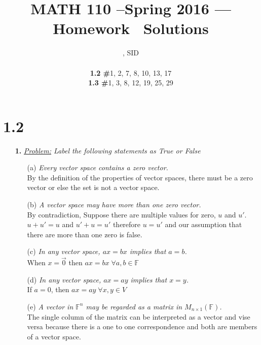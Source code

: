 \documentclass[11pt, fleqn]{article}
\title{MATH 110 --Spring 2016 --- Homework \Homework\ Solutions}
\author{\large{\Name, SID \SID}\\\small{\parbox{0cm}{\begin{tabbing}\textbf{1.2 \#}1, 2, 7, 8, 10, 13, 17\\\textbf{1.3 \#}1, 3, 8, 12, 19, 25, 29\end{tabbing}}}}
\date{}
\begin{document}
\maketitle
\section*{1.2}
\begin{itemize}
    \setlength\itemsep{5ex}
    \item [\textbf{1.}]
    \textit{\underline{Problem:} Label the following statements as True or False}
    \begin{itemize}
        \item[(a)] \textit{Every vector space contains a zero vector.}\\[1ex]
            \textbf{} By the definition of the properties of vector spaces, there must be a zero vector or else the set is not a vector space.\vspace{2ex}
            
        \item[(b)] \textit{A vector space may have more than one zero vector.}\\[1ex]
            \textbf{} By contradiction, Suppose there are multiple values for zero, $u$ and $u'$. $u + u' = u$ and $u' + u = u'$ therefore $u=u'$ and our assumption that there are more than one zero is false.\vspace{2ex}
            
        \item[(c)] \textit{In any vector space, $ax = bx$ implies that $a = b$.}\\[1ex]
            \textbf{} When $x=\vec{0}$ then $ax=bx\;\forall a,b \in \mathbb{F}$\vspace{2ex}
            
        \item[(d)] \textit{In any vector space, $ax = ay$ implies that $x = y$.}\\[1ex]
            \textbf{} If $a = 0$, then $ax=ay\;\forall x,y \in V$\vspace{2ex}
            
        \item[(e)] \textit{A vector in $\mathbb{F}^n$ may be regarded as a matrix in $M_{n\times1}(\mathbb{F})$.}\\[1ex]
            \textbf{} The single column of the matrix can be interpreted as a vector and vise versa because there is a one to one correspondence and both are members of a vector space.\vspace{2ex}
            

\end{itemize}
\end{itemize}
\end{document}
